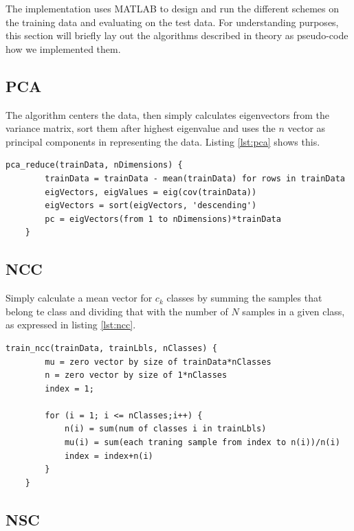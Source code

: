 \documentclass[journal]{IEEEtran}
\begin{document}
The implementation uses MATLAB to design and run the different schemes on the training data and evaluating on the test data. For understanding purposes, this section will briefly lay out the algorithms described in theory as pseudo-code how we implemented them.

\subsection{PCA} 

The algorithm centers the data, then simply calculates eigenvectors from the variance matrix, sort them after highest eigenvalue and uses the $n$ vector as principal components in representing the data. Listing \ref{lst:pca} shows this.

\begin{minipage}[t]{0.95\linewidth}
	\begin{lstlisting}[caption=Implementation of PCA., label={lst:pca}]
	pca_reduce(trainData, nDimensions) {
		trainData = trainData - mean(trainData) for rows in trainData
		eigVectors, eigValues = eig(cov(trainData))
		eigVectors = sort(eigVectors, 'descending')
		pc = eigVectors(from 1 to nDimensions)*trainData
	}
	\end{lstlisting}
\end{minipage}

\subsection{NCC} 

Simply calculate a mean vector for $c_{k}$ classes by summing the samples that belong te class and dividing that with the number of $N$ samples in a given class, as expressed in listing \ref{lst:ncc}.

\begin{minipage}[H]{0.95\linewidth}
	\begin{lstlisting}[caption=Implementation of NCC., label={lst:ncc}]
	train_ncc(trainData, trainLbls, nClasses) {
		mu = zero vector by size of trainData*nClasses
		n = zero vector by size of 1*nClasses
		index = 1;
		
		for (i = 1; i <= nClasses;i++) {
			n(i) = sum(num of classes i in trainLbls)
			mu(i) = sum(each traning sample from index to n(i))/n(i)		
			index = index+n(i)
		}
	}
	\end{lstlisting}
\end{minipage}

\subsection{NSC} 
\end{document}
